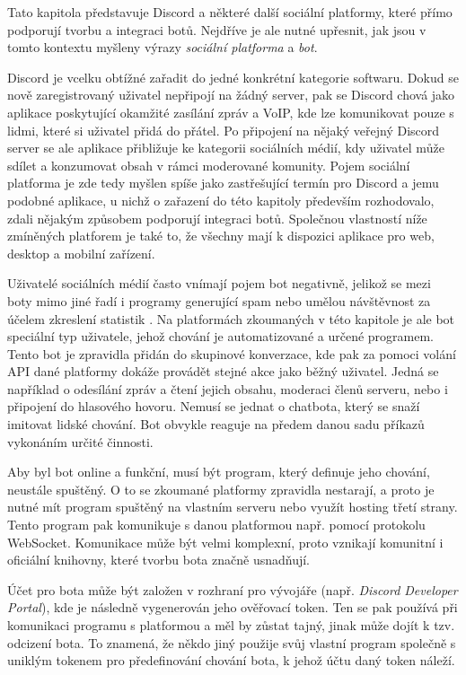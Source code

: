 \documentclass[FM]{tulthesis}
\begin{document}
	Tato kapitola představuje Discord a některé další sociální platformy, které přímo podporují tvorbu a integraci botů. Nejdříve je ale nutné upřesnit, jak jsou v tomto kontextu myšleny výrazy \textit{sociální platforma} a \textit{bot}.
	
	Discord je vcelku obtížné zařadit do jedné konkrétní kategorie softwaru. Dokud se nově zaregistrovaný uživatel nepřipojí na žádný server, pak se Discord chová jako aplikace poskytující okamžité zasílání zpráv a VoIP, kde lze komunikovat pouze s lidmi, které si uživatel přidá do přátel. Po připojení na nějaký veřejný Discord server se ale aplikace přibližuje ke kategorii sociálních médií, kdy uživatel může sdílet a konzumovat obsah v rámci moderované komunity. Pojem sociální platforma je zde tedy myšlen spíše jako zastřešující termín pro Discord a jemu podobné aplikace, u nichž o zařazení do této kapitoly především rozhodovalo, zdali nějakým způsobem podporují integraci botů. Společnou vlastností níže zmíněných platforem je také to, že všechny mají k dispozici aplikace pro web, desktop a mobilní zařízení.
	
	Uživatelé sociálních médií často vnímají pojem bot negativně, jelikož se mezi boty mimo jiné řadí i programy generující spam nebo umělou návštěvnost za účelem zkreslení statistik \cite{lit_Discord}. Na platformách zkoumaných v této kapitole je ale bot speciální typ uživatele, jehož chování je automatizované a určené programem. Tento bot je zpravidla přidán do skupinové konverzace, kde pak za pomoci volání API dané platformy dokáže provádět stejné akce jako běžný uživatel. Jedná se například o odesílání zpráv a čtení jejich obsahu, moderaci členů serveru, nebo i připojení do hlasového hovoru. Nemusí se jednat o chatbota, který se snaží imitovat lidské chování. Bot obvykle reaguje na předem danou sadu příkazů vykonáním určité činnosti.
		
	Aby byl bot online a funkční, musí být program, který definuje jeho chování, neustále spuštěný. O to se zkoumané platformy zpravidla nestarají, a proto je nutné mít program spuštěný na vlastním serveru nebo využít hosting třetí strany. Tento program pak komunikuje s danou platformou např. pomocí protokolu \mbox{WebSocket}. Komunikace může být velmi komplexní, proto vznikají komunitní i oficiální knihovny, které tvorbu bota značně usnadňují.
	
	Účet pro bota může být založen v rozhraní pro vývojáře (např. \textit{Discord Developer Portal}), kde je následně vygenerován jeho ověřovací token. Ten se pak používá při komunikaci programu s platformou a měl by zůstat tajný, jinak může dojít k tzv. odcizení bota. To znamená, že někdo jiný použije svůj vlastní program společně s uniklým tokenem pro předefinování chování bota, k jehož účtu daný token náleží.
	
\end{document}
